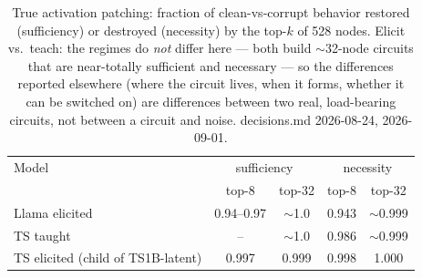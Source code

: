 \begin{table}[t]
\centering
\begin{tabular}{lcccc}
\hline
Model & \multicolumn{2}{c}{sufficiency} & \multicolumn{2}{c}{necessity} \\
 & top-8 & top-32 & top-8 & top-32 \\
\hline
Llama elicited & 0.94--0.97 & $\sim$1.0 & 0.943 & $\sim$0.999 \\
TS taught & -- & $\sim$1.0 & 0.986 & $\sim$0.999 \\
TS elicited (child of TS1B-latent) & 0.997 & 0.999 & 0.998 & 1.000 \\
\hline
\end{tabular}
\caption{True activation patching: fraction of clean-vs-corrupt behavior restored (sufficiency) or destroyed (necessity) by the top-$k$ of 528 nodes. Elicit vs.\ teach: the regimes do \emph{not} differ here --- both build $\sim$32-node circuits that are near-totally sufficient and necessary --- so the differences reported elsewhere (where the circuit lives, when it forms, whether it can be switched on) are differences between two real, load-bearing circuits, not between a circuit and noise. decisions.md 2026-08-24, 2026-09-01.}
\label{tab:faithfulness}
\end{table}
